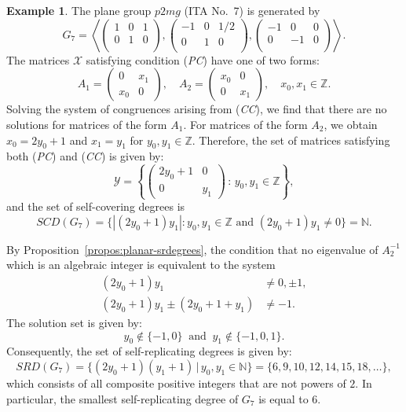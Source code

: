 \documentclass[draft]{adm-paper}
\theoremstyle{definition}
\newtheorem{example}{Example}
\begin{document}
\begin{example}
The plane group $p2mg$ (ITA No.~7) is generated by
\[
G_7 = \left\langle\left(\begin{array}{rr|r}
1 & 0 & 1 \\
0 & 1 & 0 \\
\end{array}\right),\left(\begin{array}{rr|r}
-1 & 0 & 1/2 \\
0 & 1 & 0 \\
\end{array}\right),\left(\begin{array}{rr|r}
-1 & 0 & 0 \\
0 & -1 & 0 \\
\end{array}\right)  \right\rangle.
\]
The matrices $\mathcal{X}$ satisfying condition (\textit{PC}) have one of two forms:
\[
A_1 = \left(\begin{array}{rr}
0 & x_{1} \\
x_{0} & 0
\end{array}\right), \quad A_2 = \left(\begin{array}{rr}
x_{0} & 0 \\
0 & x_{1}
\end{array} \right), \quad  x_0,x_1 \in \mathbb{Z}.
\]
Solving the system of congruences arising from (\textit{CC}), we find that there are no solutions for matrices of the form $A_1$. For matrices of the form $A_2$, we obtain $x_0 = 2y_0 + 1$ and $x_1 = y_1$ for $y_0,y_1 \in \mathbb{Z}$.
Therefore, the set of matrices satisfying both (\textit{PC}) and (\textit{CC}) is given by:
\[
\mathcal{Y} = \left\{\left(\begin{array}{rr}
2y_0 + 1 & 0 \\
0 & y_1
\end{array} \right) \, : \,  y_0, y_1 \in \mathbb{Z} \right\},
\]
and the set of self-covering degrees is
\[
SCD(G_7) = \{ |(2y_0 + 1) y_1| :  y_0, y_1 \in \mathbb{Z} \text{ and } (2y_0 + 1)y_1\neq 0 \} = \mathbb{N}.
\]

By Proposition~\ref{propos:planar-srdegrees}, the condition that no eigenvalue of $A_2^{-1}$ which is an algebraic
integer is equivalent to the system
\begin{align*}
(2y_0 + 1) y_1 & \neq 0, \pm 1, \\
(2y_0 + 1) y_1 \pm (2y_0+1+y_1) & \neq -1.
\end{align*}
The solution set is given by:
\[
y_0\not\in\{-1,0\} \ \text{ and } \ y_1\not\in\{-1,0,1\}.
\]
Consequently, the set of self-replicating degrees is given by:
\[
SRD(G_7) = \{ (2y_0 + 1)(y_1+1) \, | \, y_0,y_1 \in \mathbb{N}\}=\{6, 9, 10, 12, 14, 15, 18, \dots\},
\]
which consists of all composite positive integers that are not powers of $2$. In particular, the smallest self-replicating degree of $G_7$ is equal to $6$.
\end{example}
\end{document}
